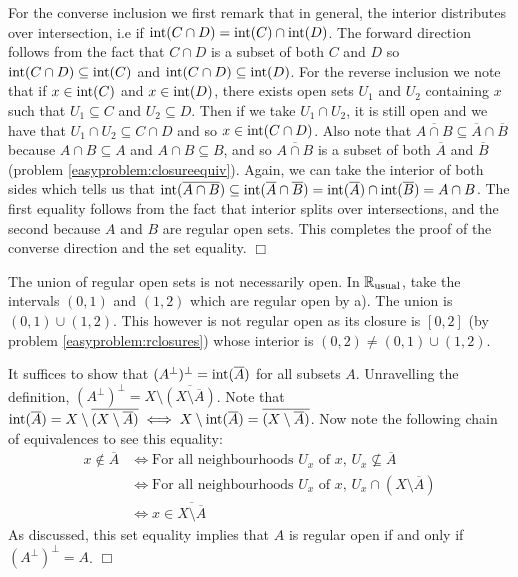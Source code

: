 \documentclass{article}
\begin{document}
{\begin{spacedenumerate}
    For the converse inclusion we first remark that in general, the interior distributes over intersection, i.e if $\operatorname{int}(C\cap D) = \operatorname{int}(C)\cap \operatorname{int}(D)$. The forward direction follows from the fact that $C\cap D$ is a subset of both $C$ and $D$ so $\operatorname{int}(C\cap D)\subseteq \operatorname{int}(C)$ and $\operatorname{int}(C\cap D)\subseteq \operatorname{int}(D)$. For the reverse inclusion we note that if $x\in \operatorname{int}(C)$ and $x\in \operatorname{int}(D)$, there exists open sets $U_{1}$ and $U_{2}$ containing $x$ such that $U_{1}\subseteq C$ and $U_{2}\subseteq D$. Then if we take $U_{1}\cap U_{2}$, it is still open and we have that $U_{1}\cap U_{2}\subseteq C\cap D$ and so $x\in \operatorname{int}(C\cap D)$. Also note that $\overline{A\cap B}\subseteq \overline{A}\cap \overline{B}$ because $A\cap B\subseteq A$ and $A\cap B\subseteq B$, and so $\overline{A\cap B}$ is a subset of both $\overline{A}$ and $\overline{B}$ (problem \ref{easyproblem:closureequiv}). Again, we can take the interior of both sides which tells us that $\operatorname{int}(\overline{A\cap B})\subseteq \operatorname{int}(\overline{A}\cap \overline{B}) = \operatorname{int}(\overline{A})\cap \operatorname{int}(\overline{B}) = A \cap B$. The first equality follows from the fact that interior splits over intersections, and the second because $A$ and $B$ are regular open sets. This completes the proof of the converse direction and the set equality. $\Box$
    \item The union of regular open sets is not necessarily open. In $\mathbb{R}_{\text{usual}}$, take the intervals $(0,1)$ and $(1,2)$ which are regular open by a). The union is $(0,1)\cup (1,2)$. This however is not regular open as its closure is $[0,2]$ (by problem \ref{easyproblem:rclosures}) whose interior is $(0,2)\neq (0,1)\cup (1,2)$.
    \item It suffices to show that $(A^{\perp})^{\perp} = \operatorname{int}(\overline{A})$ for all subsets $A$. Unravelling the definition, $(A^{\perp})^{\perp} = X\setminus\overline{(X\setminus\overline{A})}$. Note that $\operatorname{int}(\overline{A}) = X\setminus\overline{(X\setminus\overline{A})}\iff X\setminus \operatorname{int}(\overline{A}) = \overline{(X\setminus\overline{A})}$. Now note the following chain of equivalences to see this equality:
    \begin{align*}
        x\not\in \overline{A} &\iff \text{For all neighbourhoods $U_{x}$ of $x$, $U_{x}\not\subseteq \overline{A}$}\\
        &\iff \text{For all neighbourhoods $U_{x}$ of $x$, $U_{x}\cap(X\setminus \overline{A})$}\\
        &\iff x\in \overline{X\setminus \overline{A}}
    \end{align*}
    As discussed, this set equality implies that $A$ is regular open if and only if $(A^{\perp})^{\perp} = A$. $\Box$
\end{spacedenumerate}
}
\end{document}
